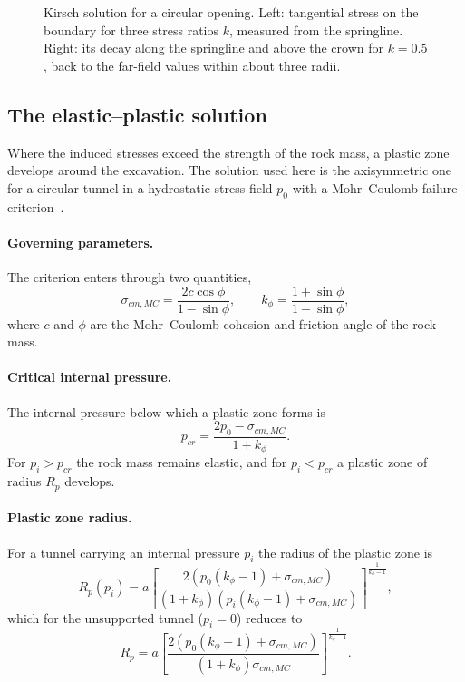 \begin{figure}[htbp]
\centering
{}
\caption{Kirsch solution for a circular opening. Left: tangential stress on the boundary for three stress ratios $k$, measured from the springline. Right: its decay along the springline and above the crown for $k = 0.5$, back to the far-field values within about three radii.}
\label{fig:kirsch-stress}
\end{figure}

\subsection{The elastic--plastic solution}
\label{sec:elastic-and-elastic-plastic-solutions}

Where the induced stresses exceed the strength of the rock mass, a plastic
zone develops around the excavation. The solution used here is the
axisymmetric one for a circular tunnel in a hydrostatic stress field $p_0$
with a Mohr--Coulomb failure criterion~\citep{hoek1998tunnel}.

\paragraph{Governing parameters.}
The criterion enters through two quantities,
\[
\sigma_{cm,MC} = \frac{2c\cos\phi}{1-\sin\phi}, \qquad
k_\phi = \frac{1+\sin\phi}{1-\sin\phi},
\]
where $c$ and $\phi$ are the Mohr--Coulomb cohesion and friction angle of
the rock mass.

\paragraph{Critical internal pressure.}
The internal pressure below which a plastic zone forms is
\[
p_{cr} = \frac{2p_0 - \sigma_{cm,MC}}{1 + k_\phi}.
\]
For $p_i > p_{cr}$ the rock mass remains elastic, and for $p_i < p_{cr}$ a
plastic zone of radius $R_p$ develops.

\paragraph{Plastic zone radius.}
For a tunnel carrying an internal pressure $p_i$ the radius of the plastic
zone is
\[
R_p(p_i) = a \left[ \frac{2\left(p_0(k_\phi-1)+\sigma_{cm,MC}\right)}{(1+k_\phi)\left(p_i(k_\phi-1)+\sigma_{cm,MC}\right)} \right]^{\frac{1}{k_\phi-1}} ,
\]
which for the unsupported tunnel ($p_i = 0$) reduces to
\[
R_p = a \left[ \frac{2\left(p_0(k_\phi - 1) + \sigma_{cm,MC}\right)}{(1 + k_\phi)\sigma_{cm,MC}} \right]^{\frac{1}{k_\phi-1}}.
\]

